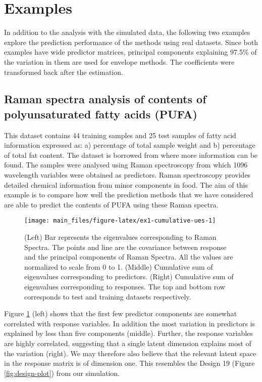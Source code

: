 \documentclass[review]{elsarticle}
\begin{document}
\section{Examples}\label{examples}

In addition to the analysis with the simulated data, the following two
examples explore the prediction performance of the methods using real
datasets. Since both examples have wide predictor matrices, principal
components explaining 97.5\% of the variation in them are used for
envelope methods. The coefficients were transformed back after the
estimation.

\subsection{Raman spectra analysis of contents of polyunsaturated fatty
acids
(PUFA)}\label{raman-spectra-analysis-of-contents-of-polyunsaturated-fatty-acids-pufa}

This dataset contains 44 training samples and 25 test samples of fatty
acid information expressed as: a) percentage of total sample weight and
b) percentage of total fat content. The dataset is borrowed from
\citet{naes2013multi} where more information can be found. The samples
were analysed using Raman spectroscopy from which 1096 wavelength
variables were obtained as predictors. Raman spectroscopy provides
detailed chemical information from minor components in food. The aim of
this example is to compare how well the prediction methods that we have
considered are able to predict the contents of PUFA using these Raman
spectra.









\begin{figure}
\texttt{[image: main\_files/figure-latex/ex1-cumulative-ues-1]} \caption{(Left) Bar represents the eigenvalues
corresponding to Raman Spectra. The points and line are the covariance
between response and the principal components of Raman Spectra. All the
values are normalized to scale from 0 to 1. (Middle) Cumulative sum of
eigenvalues corresponding to predictors. (Right) Cumulative sum of
eigenvalues corresponding to responses. The top and bottom row
corresponds to test and training datasets respectively.}\label{fig:ex1-cumulative-ues}
\end{figure}

Figure \ref{fig:ex1-cumulative-ues} (left) shows that the first few
predictor components are somewhat correlated with response variables. In
addition the most variation in predictors is explained by less than five
components (middle). Further, the response variables are highly
correlated, suggesting that a single latent dimension explains most of
the variation (right). We may therefore also believe that the relevant
latent space in the response matrix is of dimension one. This resembles
the Design 19 (Figure \ref{fig:design-plot}) from our simulation.
\end{document}
